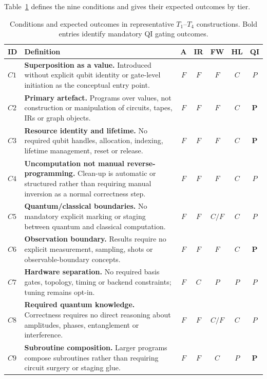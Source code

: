 Table~\ref{tab:evaluation_instrument:expected_profile} defines the nine conditions and gives their expected outcomes by tier.

\begin{table}[t]
    \centering
    \caption{Conditions and expected outcomes in representative $T_1$--$T_4$ constructions.
    Bold entries identify mandatory QI gating outcomes.}
    \label{tab:evaluation_instrument:expected_profile}
    \footnotesize
    \setlength{\tabcolsep}{3pt}
    \begin{tabular}{lp{}ccccc}
        \toprule
        \textbf{ID} & \textbf{Definition}                                                                                                                                             & \textbf{A} & \textbf{IR} & \textbf{FW} & \textbf{HL} & \textbf{QI}  \\
        \midrule
        $C1$        & \textbf{Superposition as a value.} Introduced without explicit qubit identity or gate-level initiation as the conceptual entry point. & $F$ & $F$ & $F$ & $C$ & $P$ \\
        $C2$        & \textbf{Primary artefact.} Programs over values, not construction or manipulation of circuits, tapes, IRs or graph objects. & $F$ & $F$ & $F$ & $C$ & $\mathbf{P}$ \\
        $C3$        & \textbf{Resource identity and lifetime.} No required qubit handles, allocation, indexing, lifetime management, reset or release. & $F$ & $F$ & $F$ & $C$ & $\mathbf{P}$ \\
        $C4$        & \textbf{Uncomputation not manual reverse-programming.} Clean-up is automatic or structured rather than requiring manual inversion as a normal correctness step. & $F$ & $F$ & $F$ & $C$ & $P$ \\
        $C5$        & \textbf{Quantum/classical boundaries.} No mandatory explicit marking or staging between quantum and classical computation. & $F$ & $F$ & $C/F$ & $C$ & $P$ \\
        $C6$        & \textbf{Observation boundary.} Results require no explicit measurement, sampling, shots or observable-boundary concepts. & $F$ & $F$ & $F$ & $C$ & $\mathbf{P}$ \\
        $C7$        & \textbf{Hardware separation.} No required basis gates, topology, timing or backend constraints; tuning remains opt-in. & $F$ & $C$ & $P$ & $P$ & $P$ \\
        $C8$        & \textbf{Required quantum knowledge.} Correctness requires no direct reasoning about amplitudes, phases, entanglement or interference. & $F$ & $F$ & $C/F$ & $C$ & $P$ \\
        $C9$        & \textbf{Subroutine composition.} Larger programs compose subroutines rather than requiring circuit surgery or staging glue. & $F$ & $F$ & $C$ & $P$ & $\mathbf{P}$ \\
        \bottomrule
    \end{tabular}
\end{table}

